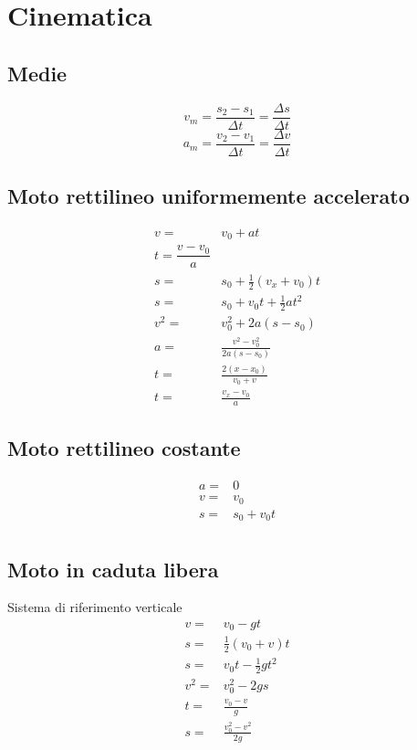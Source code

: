 \chapter{Cinematica}
\section{Medie}
\begin{equation*}
v_m=\dfrac{s_2-s_1}{\Delta t}=\dfrac{\Delta s}{\Delta t}
\end{equation*}
\begin{equation*}
a_m=\dfrac{v_2-v_1}{\Delta t}=\dfrac{\Delta v}{\Delta t}
\end{equation*}
\section{Moto rettilineo uniformemente accelerato}
\begin{align*}
v=&v_0+at\\
t=\dfrac{v-v_0}{a}\\
s=&s_0+\frac{1}{2}(v_x+v_0)t\\
s=&s_0+v_0t+\frac{1}{2}at^2\\
v^2=&v_{0}^2+2a(s-s_0)\\
a=&\frac{v^2-v_{0}^2}{2a(s-s_0)}\\
t=&\frac{2(x-x_0)}{v_0+v}\\
t=&\frac{v_x-v_0}{a}
\end{align*}
\section{Moto rettilineo costante}
\begin{align*}
a=&0\\
v=&v_0\\
s=&s_0+v_0t\\
\end{align*}
\section{Moto in caduta libera}
Sistema di riferimento verticale 
\begin{align*}
v=&v_0-gt\\
s=&\frac{1}{2}(v_0+v)t\\
s=&v_0t-\frac{1}{2}gt^2\\
v^2=&v_{0}^2-2gs\\
t=&\frac{v_0-v}{g}\\
s=&\frac{v_{0}^2-v^2}{2g}
\end{align*}
